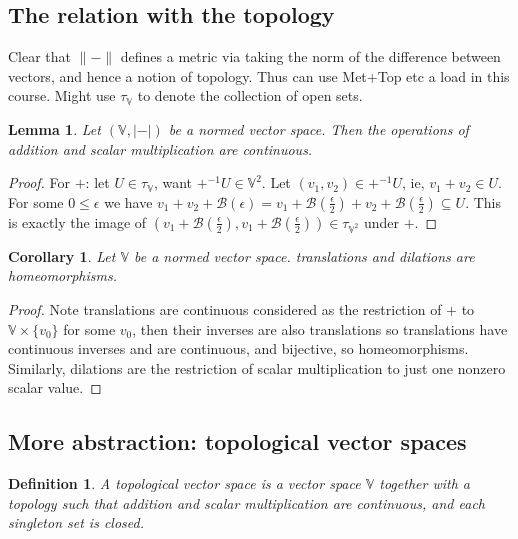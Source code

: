 \documentclass{article}
\newtheorem{corollary}{Corollary}[theorem]
\newtheorem{lemma}{Lemma}[subsection]
\newtheorem{definition}{Definition}[subsection]
\begin{document}
\subsection{The relation with the topology}
Clear that $\|-\|$ defines a metric via taking the norm of the difference between vectors, and hence a notion of topology.  Thus can use Met+Top etc a load in this course.  Might use $\tau_\mathbb{V}$ to denote the collection of open sets.
\begin{lemma}
  Let $(\mathbb V,|-|)$ be a normed vector space.  Then the operations of addition and scalar multiplication are continuous.
\end{lemma}
\begin{proof}
  For $+$: let $U\in\tau_\mathbb V$, want $+^{-1}U\in\mathbb V^2$.  Let $(v_1,v_2)\in +^{-1}U$, ie, $v_1+v_2\in U$.  For some $0\leq\epsilon$ we have $v_1+v_2+\mathcal B(\epsilon)=v_1+\mathcal B(\frac{\epsilon}{2})+v_2+\mathcal B(\frac{\epsilon}{2})\subseteq U$.  This is exactly the image of $(v_1+\mathcal B(\frac{\epsilon}{2}),v_1+\mathcal B(\frac{\epsilon}{2}))\in\tau_{\mathbb V^2}$ under $+$.
\end{proof}
\begin{corollary}
  Let $\mathbb V$ be a normed vector space. translations and dilations are homeomorphisms.
\end{corollary}
\begin{proof}
  Note translations are continuous considered as the restriction of $+$ to $\mathbb V \times \{v_0\}$ for some $v_0$, then their inverses are also translations so translations have continuous inverses and are continuous, and bijective, so homeomorphisms.  Similarly, dilations are the restriction of scalar multiplication to just one nonzero scalar value.
\end{proof}
\subsection{More abstraction: topological vector spaces}
\begin{definition}
  A topological vector space is a vector space $\mathbb V$ together with a topology such that addition and scalar multiplication are continuous, and each singleton set is closed.
\end{definition}
\end{document}
